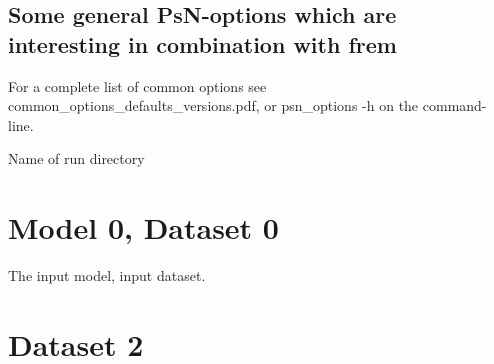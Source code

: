 \subsection{Some general PsN-options which are interesting in combination with frem}
For a complete list of common options see common\_options\_defaults\_versions.pdf, or psn\_options -h on the command-line.

\begin{optionlist}
Name of run directory 
\nextopt
\end{optionlist}


\section{Model 0, Dataset 0}
The input model, input dataset.

\section{Dataset 2}

